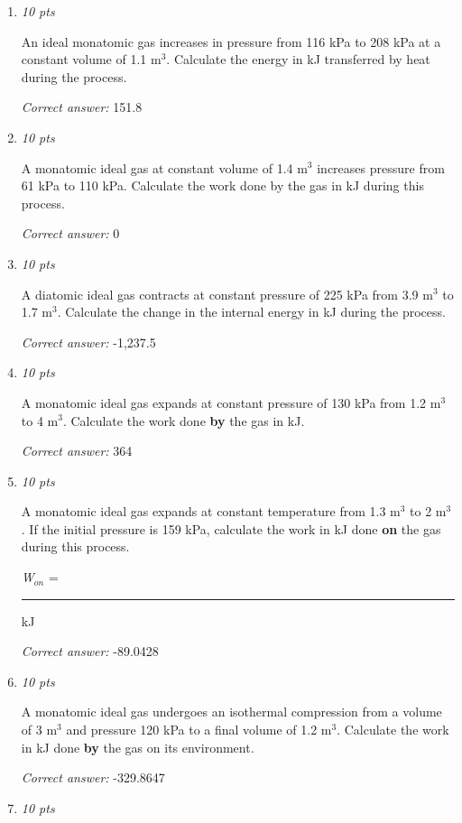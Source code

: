 \documentclass[11pt]{article}
\begin{document}
\begin{enumerate}[leftmargin=*,label=\textbf{Question \arabic*.}]
\textit{Correct answer:} 244.72

\item \hfill \textit{10 pts}

An ideal monatomic gas increases in pressure from 116 kPa to 208 kPa at a constant volume of 1.1 m$^{3}$. Calculate the energy in kJ transferred by heat during the process.

\textit{Correct answer:} 151.8

\item \hfill \textit{10 pts}

A monatomic ideal gas at constant volume of 1.4 m$^{3}$ increases pressure from 61 kPa to 110 kPa. Calculate the work done by the gas in kJ during this process.

\textit{Correct answer:} 0

\item \hfill \textit{10 pts}

A diatomic ideal gas contracts at constant pressure of 225 kPa from 3.9 m$^{3}$ to 1.7 m$^{3}$. Calculate the change in the internal energy in kJ during the process.

\textit{Correct answer:} -1,237.5

\item \hfill \textit{10 pts}

A monatomic ideal gas expands at constant pressure of 130 kPa from 1.2 m$^{3}$ to 4 m$^{3}$. Calculate the work done \textbf{by} the gas in kJ.

\textit{Correct answer:} 364

\item \hfill \textit{10 pts}

A monatomic ideal gas expands at constant temperature from 1.3 m$^{3}$ to 2 m$^{3}$. If the initial pressure is 159 kPa, calculate the work in kJ done \textbf{on} the gas during this process.



\emph{W}$_{on}$ = \rule{2.5cm}{0.4pt} kJ

\textit{Correct answer:} -89.0428

\item \hfill \textit{10 pts}

A monatomic ideal gas undergoes an isothermal compression from a volume of 3 m$^{3}$ and pressure 120 kPa to a final volume of 1.2 m$^{3}$. Calculate the work in kJ done \textbf{by} the gas on its environment.

\textit{Correct answer:} -329.8647

\item \hfill \textit{10 pts}


\end{enumerate}
\end{document}
